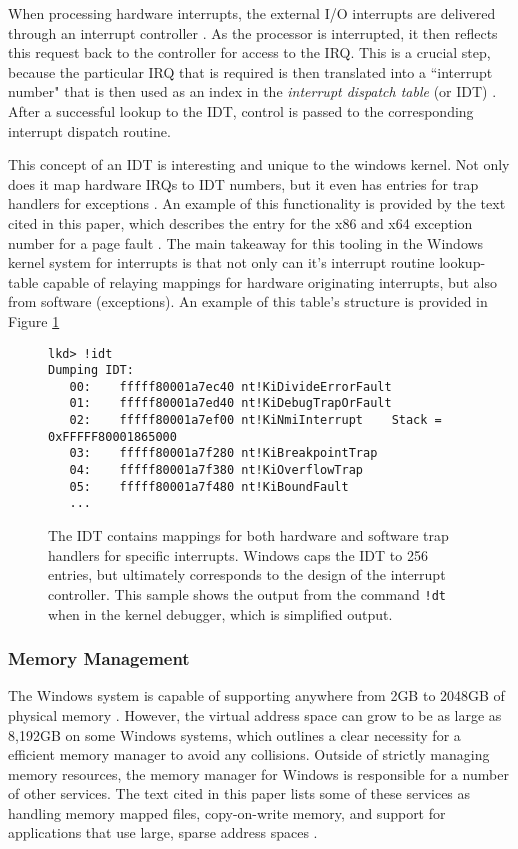 \documentclass[10pt,draftclsnofoot,onecolumn]{IEEEtran}
\begin{document}
\par When processing hardware interrupts, the external I/O interrupts are delivered through an interrupt controller \cite{win:1}.
As the processor is interrupted, it then reflects this request back to the controller for access to the IRQ.
This is a crucial step, because the particular IRQ that is required is then translated into a ``interrupt number" that is then used as an index in the \textit{interrupt dispatch table} (or IDT) \cite{win:1}.
After a successful lookup to the IDT, control is passed to the corresponding interrupt dispatch routine.

\par This concept of an IDT is interesting and unique to the windows kernel.
Not only does it map hardware IRQs to IDT numbers, but it even has entries for trap handlers for exceptions \cite{win:1}.
An example of this functionality is provided by the text cited in this paper, which describes the entry for the x86 and x64 exception number for a page fault \cite{win:1}.
The main takeaway for this tooling in the Windows kernel system for interrupts is that not only can it's interrupt routine lookup-table capable of relaying mappings for hardware originating interrupts, but also from software (exceptions).
An example of this table's structure is provided in Figure \ref{code:idt_sample}\\

\begin{figure}[h]
\begin{lstlisting}
lkd> !idt
Dumping IDT:
   00:    fffff80001a7ec40 nt!KiDivideErrorFault
   01:    fffff80001a7ed40 nt!KiDebugTrapOrFault
   02:    fffff80001a7ef00 nt!KiNmiInterrupt    Stack = 0xFFFFF80001865000
   03:    fffff80001a7f280 nt!KiBreakpointTrap
   04:    fffff80001a7f380 nt!KiOverflowTrap
   05:    fffff80001a7f480 nt!KiBoundFault
   ...
\end{lstlisting}
\centering
\captionsetup{justification=centering}
\caption{
  The IDT contains mappings for both hardware and software trap handlers for specific interrupts.
  Windows caps the IDT to 256 entries, but ultimately corresponds to the design of the interrupt controller.
  This sample shows the output from the command \texttt{!dt} when in the kernel debugger, which is simplified output.
}
\label{code:idt_sample}
\end{figure}

\subsubsection{Memory Management}
\label{sub:Memory Management Windows}
\par The Windows system is capable of supporting anywhere from 2GB to 2048GB of physical memory \cite{win:2}.
However, the virtual address space can grow to be as large as 8,192GB on some Windows systems, which outlines a clear necessity for a efficient memory manager to avoid any collisions.
Outside of strictly managing memory resources, the memory manager for Windows is responsible for a number of other services.
The text cited in this paper lists some of these services as handling memory mapped files, copy-on-write memory, and support for applications that use large, sparse address spaces \cite{win:2}.
\end{document}
